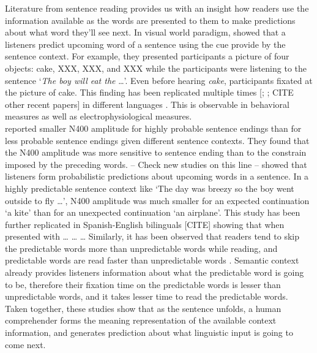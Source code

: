 \documentclass[a4paper, nobind]{templates/ociamthesis}
\begin{document}
Literature from sentence reading provides us with an insight how readers use the information available as the words are presented to them to make predictions about what word they'll see next.
In visual world paradigm, \textcite{Altmann1999} showed that a listeners predict upcoming word of a sentence using the cue provide by the sentence context.
For example, they presented participants a picture of four objects: cake, XXX, XXX, and XXX while the participants were listening to the sentence `\emph{The boy will eat the} \ldots{}'.
Even before hearing \emph{cake}, participants fixated at the picture of cake.
This finding has been replicated multiple times {[}\textcite{Kamide2003}; \textcite{Altmann2007}; CITE other recent papers{]} in different languages \autocite{MISHRA}.
This is observable in behavioral measures as well as electrophysiological measures.\\
\textcite{Kutas1984} reported smaller N400 amplitude for highly probable sentence endings than for less probable sentence endings given different sentence contexts.
They found that the N400 amplitude was more sensitive to sentence ending than to the constrain imposed by the preceding words.
-- Check new studies on this line --
\textcite{Delong2005} showed that listeners form probabilistic predictions about upcoming words in a sentence.
In a highly predictable sentence context like `The day was breezy so the boy went outside to fly \ldots{}', N400 amplitude was much smaller for an expected continuation `a kite' than for an unexpected continuation `an airplane'.
This study has been further replicated in Spanish-English bilinguals {[}CITE{]} showing that when presented with \ldots{} \ldots{} \ldots{}
Similarly, it has been observed that readers tend to skip the predictable words more than unpredictable words while reading, and predictable words are read faster than unpredictable words \autocite{Frisson2005,Rayner2011}.
Semantic context already provides listeners information about what the predictable word is going to be, therefore their fixation time on the predictable words is lesser than unpredictable words, and it takes lesser time to read the predictable words.\\
Taken together, these studies show that as the sentence unfolds, a human comprehender forms the meaning representation of the available context information, and generates prediction about what linguistic input is going to come next.\\
\end{document}
